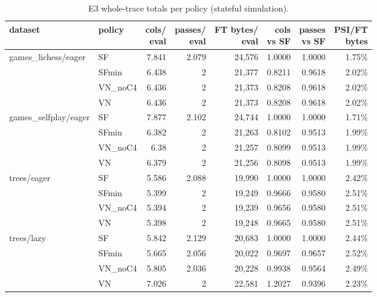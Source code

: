 \begin{table}[htbp]
\centering\small
\caption{E3 whole-trace totals per policy (stateful simulation).}\label{tab:e3}
\begin{tabular}{@{}llrrrrrr@{}}
\toprule
dataset & policy & \hd{cols/\\eval} & \hd{passes/\\eval} & \hd{FT bytes/\\eval} & \hd{cols\\vs SF} & \hd{passes\\vs SF} & \hd{PSI/FT\\bytes}\\
\midrule
games\_lichess/eager & SF & 7.841 & 2.079 & 24,576 & 1.0000 & 1.0000 & 1.75\%\\
 & SFmin & 6.438 & 2 & 21,377 & 0.8211 & 0.9618 & 2.02\%\\
 & VN\_noC4 & 6.436 & 2 & 21,373 & 0.8208 & 0.9618 & 2.02\%\\
 & VN & 6.436 & 2 & 21,373 & 0.8208 & 0.9618 & 2.02\%\\
\midrule
games\_selfplay/eager & SF & 7.877 & 2.102 & 24,744 & 1.0000 & 1.0000 & 1.71\%\\
 & SFmin & 6.382 & 2 & 21,263 & 0.8102 & 0.9513 & 1.99\%\\
 & VN\_noC4 & 6.38 & 2 & 21,257 & 0.8099 & 0.9513 & 1.99\%\\
 & VN & 6.379 & 2 & 21,256 & 0.8098 & 0.9513 & 1.99\%\\
\midrule
trees/eager & SF & 5.586 & 2.088 & 19,990 & 1.0000 & 1.0000 & 2.42\%\\
 & SFmin & 5.399 & 2 & 19,249 & 0.9666 & 0.9580 & 2.51\%\\
 & VN\_noC4 & 5.394 & 2 & 19,239 & 0.9656 & 0.9580 & 2.51\%\\
 & VN & 5.398 & 2 & 19,248 & 0.9665 & 0.9580 & 2.51\%\\
\midrule
trees/lazy & SF & 5.842 & 2.129 & 20,683 & 1.0000 & 1.0000 & 2.44\%\\
 & SFmin & 5.665 & 2.056 & 20,022 & 0.9697 & 0.9657 & 2.52\%\\
 & VN\_noC4 & 5.805 & 2.036 & 20,228 & 0.9938 & 0.9564 & 2.49\%\\
 & VN & 7.026 & 2 & 22,581 & 1.2027 & 0.9396 & 2.23\%\\
\bottomrule
\end{tabular}
\end{table}

